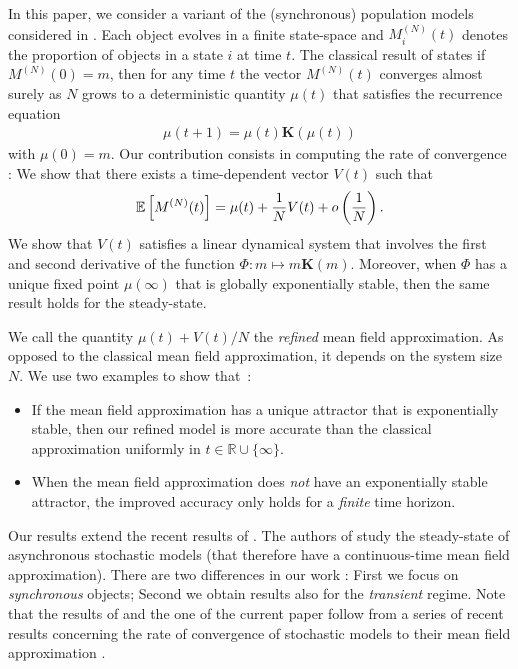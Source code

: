 \documentclass{sig-alternate-per}
\newcommand{\vr}[1]{\mathbf{#1}}
\newcommand\MN{M^{(N)}}
\newcommand\R{\mathbb{R}}
\newcommand\esp[1]{{\mathchoice{\besp{#1}}{\sesp{#1}}{\sesp{#1}}{\sesp{#1}}}}
\newcommand\besp[1]{\mathbb{E}\left[#1\right]}
\newcommand\sesp[1]{\mathbb{E}[#1]}
\newcommand\p[1]{\left(#1\right)}
\begin{document}
In this paper, we consider a variant of the (synchronous) population
models considered in \cite{Le+07,gastgaujalDEDS,latella2013fly}. Each
object evolves in a finite state-space and $\MN_i(t)$ denotes the
proportion of objects in a state $i$ at time $t$. The classical result
of \cite{Le+07} states if $\MN(0)=m$, then for any time $t$ the vector
$\MN(t)$ converges almost surely as $N$ grows to a deterministic
quantity $\mu(t)$ that satisfies the recurrence equation
\begin{align}
  \label{eq:mu}
  \mu(t+1)=\mu(t)\vr{K}(\mu(t))
\end{align}
with $\mu(0)=m$. Our contribution consists in computing the rate of
convergence : We show that there exists a time-dependent vector $V(t)$
such that
\begin{align}
  \label{eq:main_result}
  \esp{\MN(t)} = \mu(t) + \frac1N V(t) + o\p{\frac1{N}}. 
\end{align}
We show that $V(t)$ satisfies a linear dynamical system that involves
the first and second derivative of the function
$\Phi:m\mapsto m\vr{K}(m)$. Moreover, when $\Phi$ has a unique fixed
point $\mu(\infty)$ that is globally exponentially stable, then the
same result holds for the steady-state.

We call the quantity $\mu(t)+V(t)/N$ the \emph{refined} mean field
approximation. As opposed to the classical mean field approximation,
it depends on the system size $N$. We use two examples to show
that~:
\begin{itemize}[topsep=1pt,itemsep=0pt]
\item If the mean field approximation has a unique attractor that is
  exponentially stable, then our refined model is more accurate than
  the classical approximation uniformly in $t\in\R\cup\{\infty\}$.
\item When the mean field approximation does \emph{not} have an
  exponentially stable attractor, the improved accuracy only holds for
  a \emph{finite} time horizon.
\end{itemize}

Our results extend the recent results of \cite{gast2017refined}. The
authors of \cite{gast2017refined} study the steady-state of
asynchronous stochastic models (that therefore have a continuous-time
mean field approximation). There are two differences in our work :
First we focus on \emph{synchronous} objects; Second we obtain results
also for the \emph{transient} regime.  Note that the results of
\cite{gast2017refined} and the one of the current paper follow from a
series of recent results concerning the rate of convergence of
stochastic models to their mean field approximation
\cite{gast2017expected,kolokoltsov2011mean,ying2016rate}.
\end{document}
